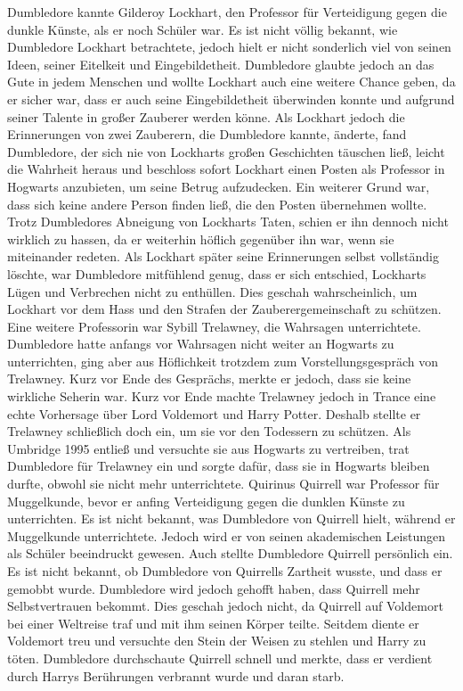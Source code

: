 \documentclass[a4paper, 10pt]{article}
\begin{document}
Dumbledore kannte Gilderoy Lockhart, den Professor für Verteidigung gegen die dunkle Künste, als er noch Schüler war. Es ist nicht völlig bekannt, wie Dumbledore Lockhart betrachtete, jedoch hielt er nicht sonderlich viel von seinen Ideen, seiner Eitelkeit und Eingebildetheit. Dumbledore glaubte jedoch an das Gute in jedem Menschen und wollte Lockhart auch eine weitere Chance geben, da er sicher war, dass er auch seine Eingebildetheit überwinden konnte und aufgrund seiner Talente in großer Zauberer werden könne. Als Lockhart jedoch die Erinnerungen von zwei Zauberern, die Dumbledore kannte, änderte, fand Dumbledore, der sich nie von Lockharts großen Geschichten täuschen ließ, leicht die Wahrheit heraus und beschloss sofort Lockhart einen Posten als Professor in Hogwarts anzubieten, um seine Betrug aufzudecken. Ein weiterer Grund war, dass sich keine andere Person finden ließ, die den Posten übernehmen wollte. Trotz Dumbledores Abneigung von Lockharts Taten, schien er ihn dennoch nicht wirklich zu hassen, da er weiterhin höflich gegenüber ihn war, wenn sie miteinander redeten. Als Lockhart später seine Erinnerungen selbst vollständig löschte, war Dumbledore mitfühlend genug, dass er sich entschied, Lockharts Lügen und Verbrechen nicht zu enthüllen. Dies geschah wahrscheinlich, um Lockhart vor dem Hass und den Strafen der Zauberergemeinschaft zu schützen.
\vspace{10pt}
\newline
Eine weitere Professorin war Sybill Trelawney, die Wahrsagen unterrichtete. Dumbledore hatte anfangs vor Wahrsagen nicht weiter an Hogwarts zu unterrichten, ging aber aus Höflichkeit trotzdem zum Vorstellungsgespräch von Trelawney. Kurz vor Ende des Gesprächs, merkte er jedoch, dass sie keine wirkliche Seherin war. Kurz vor Ende machte Trelawney jedoch in Trance eine echte Vorhersage über Lord Voldemort und Harry Potter. Deshalb stellte er Trelawney schließlich doch ein, um sie vor den Todessern zu schützen. Als Umbridge 1995 entließ und versuchte sie aus Hogwarts zu vertreiben, trat Dumbledore für Trelawney ein und sorgte dafür, dass sie in Hogwarts bleiben durfte, obwohl sie nicht mehr unterrichtete.
\vspace{10pt}
\newline
Quirinus Quirrell war Professor für Muggelkunde, bevor er anfing Verteidigung gegen die dunklen Künste zu unterrichten. Es ist nicht bekannt, was Dumbledore von Quirrell hielt, während er Muggelkunde unterrichtete. Jedoch wird er von seinen akademischen Leistungen als Schüler beeindruckt gewesen. Auch stellte Dumbledore Quirrell persönlich ein. Es ist nicht bekannt, ob Dumbledore von Quirrells Zartheit wusste, und dass er gemobbt wurde. Dumbledore wird jedoch gehofft haben, dass Quirrell mehr Selbstvertrauen bekommt. Dies geschah jedoch nicht, da Quirrell auf Voldemort bei einer Weltreise traf und mit ihm seinen Körper teilte. Seitdem diente er Voldemort treu und versuchte den Stein der Weisen zu stehlen und Harry zu töten. Dumbledore durchschaute Quirrell schnell und merkte, dass er verdient durch Harrys Berührungen verbrannt wurde und daran starb.
\end{document}

